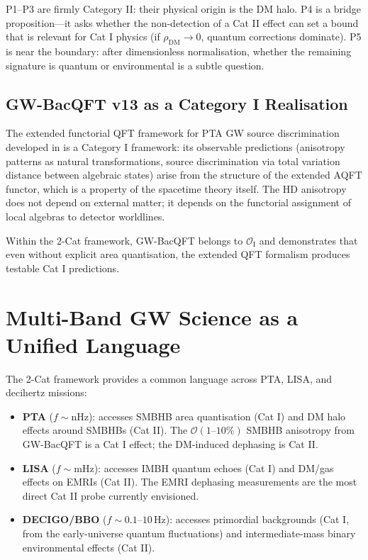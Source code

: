 \documentclass[11pt]{article}
\begin{document}
P1--P3 are firmly Category II: their physical origin is the DM halo. P4 is a bridge proposition---it asks whether the non-detection of a Cat II effect can set a bound that is relevant for Cat I physics (if $\rho_{\mathrm{DM}} \to 0$, quantum corrections dominate). P5 is near the boundary: after dimensionless normalisation, whether the remaining signature is quantum or environmental is a subtle question.

\subsection{GW-BacQFT v13 as a Category I Realisation}

The extended functorial QFT framework for PTA GW source discrimination developed in \cite{GW-BacQFT} is a Category I framework: its observable predictions (anisotropy patterns as natural transformations, source discrimination via total variation distance between algebraic states) arise from the structure of the extended AQFT functor, which is a property of the spacetime theory itself. The HD anisotropy does not depend on external matter; it depends on the functorial assignment of local algebras to detector worldlines.

Within the 2-Cat framework, GW-BacQFT belongs to $\mathcal{O}_{\mathrm{I}}$ and demonstrates that even without explicit area quantisation, the extended QFT formalism produces testable Cat I predictions.

\section{Multi-Band GW Science as a Unified Language}\label{sec:multiband}

The 2-Cat framework provides a common language across PTA, LISA, and decihertz missions:

\begin{itemize}
\item \textbf{PTA} ($f \sim \text{nHz}$): accesses SMBHB area quantisation (Cat I) and DM halo effects around SMBHBs (Cat II). The $\mathcal{O}(1\text{--}10\%)$ SMBHB anisotropy from GW-BacQFT is a Cat I effect; the DM-induced dephasing is Cat II.
\item \textbf{LISA} ($f \sim \text{mHz}$): accesses IMBH quantum echoes (Cat I) and DM/gas effects on EMRIs (Cat II). The EMRI dephasing measurements are the most direct Cat II probe currently envisioned.
\item \textbf{DECIGO/BBO} ($f \sim 0.1\text{--}10\,\mathrm{Hz}$): accesses primordial backgrounds (Cat I, from the early-universe quantum fluctuations) and intermediate-mass binary environmental effects (Cat II).
\end{itemize}
\end{document}
